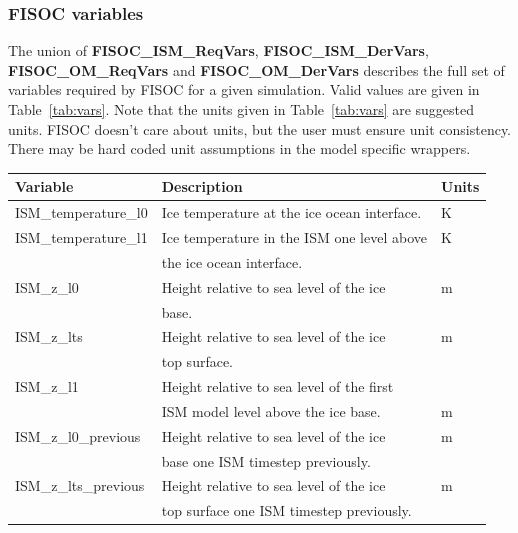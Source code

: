 \documentclass[11pt]{article}
\begin{document}
\subsubsection{FISOC variables}
\label{sec:FISOCvars}

The union of \textbf{FISOC\_ISM\_ReqVars}, \textbf{FISOC\_ISM\_DerVars}, \textbf{FISOC\_OM\_ReqVars} 
and \textbf{FISOC\_OM\_DerVars} describes the full set of variables required by FISOC for a given simulation. 
Valid values are given in Table~\ref{tab:vars}.
Note that the units given in Table~\ref{tab:vars} are suggested units.  FISOC doesn't care about units, but 
the user must ensure unit consistency.  There may be hard coded unit assumptions in the model specific 
wrappers.

\begin{table}
  \begin{center}
    \begin{tabular}{ l|l|l }
      Variable              & Description                                  & Units \\
      \hline
      ISM\_temperature\_l0  & Ice temperature at the ice ocean interface.  & K \\
      ISM\_temperature\_l1  & Ice temperature in the ISM one level above   & K \\
                            & the ice ocean interface.                     &   \\ 
      ISM\_z\_l0            & Height relative to sea level of the ice      & m \\
                            & base.                                        &   \\
      ISM\_z\_lts           & Height relative to sea level of the ice      & m \\
                            & top surface.                                 &   \\
      ISM\_z\_l1            & Height relative to sea level of the first    &   \\
                            & ISM model level above the ice base.          & m \\
      ISM\_z\_l0\_previous  & Height relative to sea level of the ice      & m \\
                            & base one ISM timestep previously.            &   \\
      ISM\_z\_lts\_previous & Height relative to sea level of the ice      & m \\
                            & top surface one ISM timestep previously.     &   \\

\end{tabular}
\end{center}
\end{table}
\end{document}
